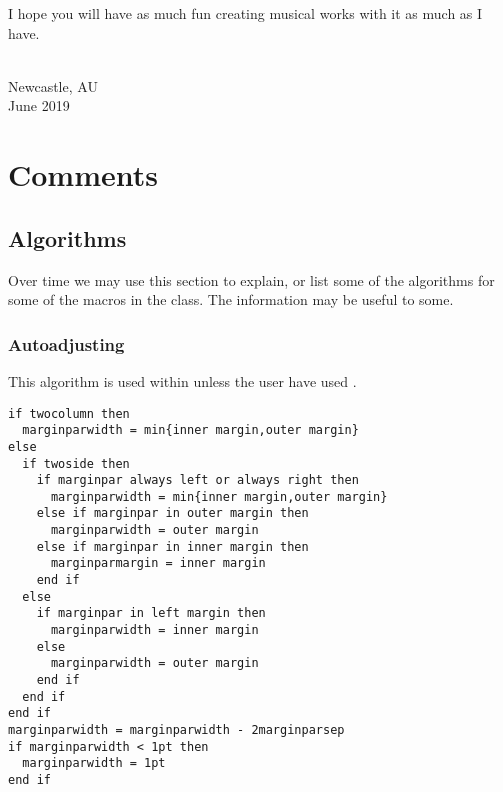 \documentclass[10pt,a4paper,extrafontsizes]{memoir}
\newcommand\svnidlong[4]{}
\begin{document}
	I hope you will have as much fun creating musical works with it as much as I have.
{ \\ Newcastle, AU \\ June 2019\par}




\svnidlong
{$Ignore: $}
{$LastChangedDate: 2015-04-22 17:17:51 +0200 (Wed, 22 Apr 2015) $}
{$LastChangedRevision: 527 $}
{$LastChangedBy: daleif $}






\cleardoublepage
{}

\mainmatter








\chapter{Comments}
\label{cha:comments}

\section{Algorithms}
\label{sec:algorithms}

Over time we may use this section to explain, or list some of the
algorithms for some of the macros in the class. The information may be
useful to some.

\subsection{Autoadjusting
  \texorpdfstring{}{\textbackslash marginparwidth}}
\label{sec:auto-csmarg}

This algorithm is used within \cmd{\fixthelayout} unless the user have
used \cmd{\setmarginnotes}.

\noindent
\begin{framed}
  \baselineskip
  \begin{small}
\begin{verbatim}
if twocolumn then
  marginparwidth = min{inner margin,outer margin}
else
  if twoside then
    if marginpar always left or always right then
      marginparwidth = min{inner margin,outer margin}
    else if marginpar in outer margin then
      marginparwidth = outer margin
    else if marginpar in inner margin then
      marginparmargin = inner margin
    end if
  else
    if marginpar in left margin then
      marginparwidth = inner margin
    else
      marginparwidth = outer margin
    end if
  end if
end if
marginparwidth = marginparwidth - 2marginparsep
if marginparwidth < 1pt then
  marginparwidth = 1pt
end if
\end{verbatim}
  \end{small}
\end{framed}
\end{document}
